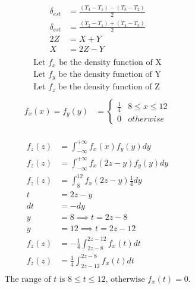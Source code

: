 \documentclass[12pt,a4paper]{article}
\begin{document}
\begin{enumerate}[label=(\alph*)]
    \begin{equation*}
        \begin{split}
            \delta_{est} &= \frac{(T_4 - T_1) - (T_3 - T_2)}{2} \\
            \delta_{est} &= \frac{(T_2 - T_1) + (T_4 - T_3)}{2} \\
            2Z &= X + Y \\
            X &= 2Z - Y \\
        \end{split}
    \end{equation*}
    \begin{equation*}
        \begin{split}
            \text{Let $f_x$ be the density function of X} \\
            \text{Let $f_y$ be the density function of Y} \\
            \text{Let $f_z$ be the density function of Z} \\
        \end{split}
    \end{equation*}
    \begin{equation*}
        \begin{split}
            f_x(x) = f_y(y) &= 
            \begin{cases}
                  \frac{1}{4}   & 8 \leq x \leq 12 \\
                  0             & otherwise
            \end{cases} \\
        \end{split}
    \end{equation*}
    
    \begin{equation*}
        \begin{split}
            f_z(z) &= \int_{-\infty}^{+\infty} f_x(x) f_y(y) dy \\
            f_z(z) &= \int_{-\infty}^{+\infty} f_x(2z - y) f_y(y) dy \\
            f_z(z) &= \int_{8}^{12} f_x(2z - y) \frac{1}{4} dy \\
            t &= 2z - y \\
            dt &= -dy \\
            y &= 8 \implies t = 2z - 8 \\
            y &= 12  \implies t = 2z - 12 \\
            f_z(z) &= - \frac{1}{4} \int_{2z-8}^{2z-12} f_x(t) dt \\
            f_z(z) &= \frac{1}{4} \int_{2z-12}^{2z-8} f_x(t) dt \\
        \end{split}
    \end{equation*}
    \begin{equation*}
        \begin{split}
            \text{The range of $t$ is $8 \leq t \leq 12$, otherwise $f_x(t) = 0$.} \\
        \end{split}
    \end{equation*}
    

\end{enumerate}
\end{document}
